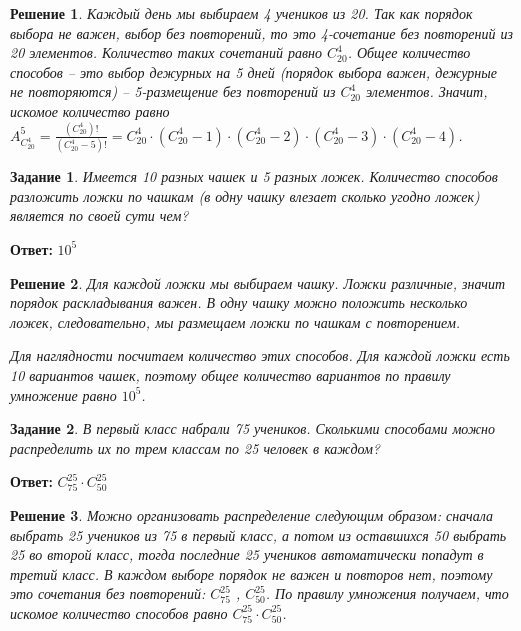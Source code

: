 \documentclass[a4paper,oneside]{memoir}
\newtheorem{task}{Задание}
\newtheorem{solution}{Решение}
\begin{document}
\begin{solution}
	Каждый день мы выбираем 4 учеников из 20. Так как порядок выбора не важен, выбор без повторений, то это 4-сочетание без повторений из 20 элементов. Количество таких сочетаний равно $ C_{20}^4 $. Общее количество способов -- это выбор дежурных на 5 дней (порядок выбора важен, дежурные не повторяются) -- 5-размещение без повторений из $ C_{20}^4 $ элементов. Значит, искомое количество равно $ A_{C_{20}^4}^5 = \frac{(C_{20}^4)!}{(C_{20}^4 - 5)!} = C_{20}^4\cdot (C_{20}^4 - 1)\cdot (C_{20}^4 - 2)\cdot (C_{20}^4 - 3)\cdot (C_{20}^4 - 4) $.
\end{solution}

\hrulefill

\begin{task}
	Имеется 10 разных чашек и 5 разных ложек. Количество способов разложить ложки по чашкам (в одну чашку влезает сколько угодно ложек) является по своей сути чем?
\end{task}

\textbf{Ответ:} $ 10^5 $

\begin{solution}
	Для каждой ложки мы выбираем чашку. Ложки различные, значит порядок раскладывания важен. В одну чашку можно положить несколько ложек, следовательно, мы размещаем ложки по чашкам с повторением.
	
	Для наглядности посчитаем количество этих способов. Для каждой ложки есть 10 вариантов чашек, поэтому общее количество вариантов по правилу умножение равно $ 10^5 $.
\end{solution}

\hrulefill
\begin{task}
	В первый класс набрали 75 учеников. Сколькими способами можно распределить их по трем классам по 25 человек в каждом?
\end{task}

\textbf{Ответ:} $ C_{75}^{25} \cdot C_{50}^{25} $

\begin{solution}
	Можно организовать распределение следующим образом: сначала выбрать 25 учеников из 75 в первый класс, а потом из оставшихся 50 выбрать 25 во второй класс, тогда последние 25 учеников автоматически попадут в третий класс. В каждом выборе порядок не важен и повторов нет, поэтому это сочетания без повторений: $ C_{75}^{25} $ , $ C_{50}^{25} $. По правилу умножения получаем, что искомое количество способов равно $ C_{75}^{25} \cdot C_{50}^{25} $.
\end{solution}
\end{document}
